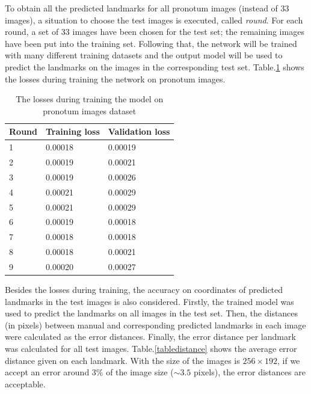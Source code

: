\documentclass[10pt]{article}
\begin{document}
To obtain all the predicted landmarks for all pronotum images (instead of $33$ images), a situation to choose the test images is executed, called \textit{round}. For each round, a set of 33 images have been chosen for the test set; the remaining images have been put into the training set. Following that, the network will be trained with many different training datasets and the output model will be used to predict the landmarks on the images in the corresponding test set. Table.\ref{tbltrainingloss} shows the losses during training the network on pronotum images.

\begin{table}[h!]
	\centering
	\begin{tabular}{l l l}
	Round & Training loss & Validation loss \\ \hline
	1 & 0.00018 & 0.00019  \\ \hline
	2 & 0.00019 & 0.00021 \\ \hline
	3 & 0.00019 & 0.00026 \\ \hline
	4 & 0.00021 & 0.00029 \\ \hline
	5 & 0.00021 & 0.00029 \\ \hline
	6 & 0.00019 & 0.00018 \\ \hline
	7 & 0.00018 & 0.00018 \\ \hline
	8 & 0.00018 & 0.00021 \\ \hline
	9 & 0.00020 & 0.00027 \\ \hline
	\end{tabular}
	\caption{The losses during training the model on pronotum images dataset}
	\label{tbltrainingloss}
\end{table}

Besides the losses during training, the accuracy on coordinates of
predicted landmarks in the test images is also considered. Firstly,
the trained model was used to predict the landmarks on all images in
the test set. Then, the distances (in pixels) between manual and
corresponding predicted landmarks in each image were calculated as the
error distances. Finally, the error distance per landmark was
calculated for all test images. Table.\ref{tabledistance} shows the
average error distance given on each landmark. With the size of the
images is $256 \times 192$, if we accept an error around $3\%$ of the
image size ($ \sim3.5$ pixels), the error distances are acceptable.
\end{document}
